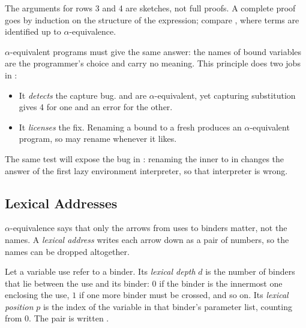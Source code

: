 \begin{remark}
The arguments for rows 3 and 4 are sketches, not full proofs. A complete proof goes by induction on the structure of the expression; compare \cite[Section~5.3]{TAPL}, where terms are identified up to $\alpha$-equivalence.
\end{remark}

\begin{keypoint}
$\alpha$-equivalent programs must give the same answer: the names of bound variables are the programmer's choice and carry no meaning. This principle does two jobs in :
\begin{itemize}
  \item It \emph{detects} the capture bug.  and  are $\alpha$-equivalent, yet capturing substitution gives 4 for one and an error for the other.
  \item It \emph{licenses} the fix. Renaming a bound  to a fresh  produces an $\alpha$-equivalent program, so  may rename whenever it likes.
\end{itemize}
\end{keypoint}

The same test will expose the bug in : renaming the inner  to  in  changes the answer of the first lazy environment interpreter, so that interpreter is wrong.

\subsection{Lexical Addresses}
\label{sec:lexaddr}

$\alpha$-equivalence says that only the arrows from uses to binders matter, not the names. A \emph{lexical address} writes each arrow down as a pair of numbers, so the names can be dropped altogether.

\begin{definition}
Let a variable use refer to a binder. Its \emph{lexical depth} $d$ is the number of binders that lie between the use and its binder: $0$ if the binder is the innermost one enclosing the use, $1$ if one more binder must be crossed, and so on. Its \emph{lexical position} $p$ is the index of the variable in that binder's parameter list, counting from $0$. The pair is written .
\end{definition}

